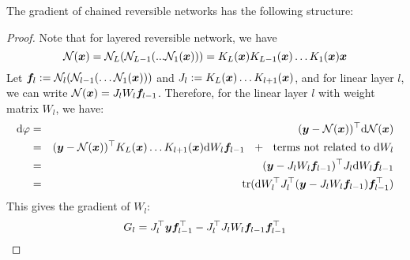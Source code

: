 The gradient of chained reversible networks has the following structure:
\gradientreversible*
\begin{proof}
Note that for layered reversible network, we have 
\begin{equation}
\mathcal{N}({\bm{x}}) = \mathcal{N}_L(\mathcal{N}_{L-1}(...\mathcal{N}_1({\bm{x}}))) = K_L({\bm{x}})K_{L-1}({\bm{x}})\ldots K_1({\bm{x}}){\bm{x}} 
\end{equation}
Let ${\bm{f}}_l := \mathcal{N}_l(\mathcal{N}_{l-1}(\ldots\mathcal{N}_1({\bm{x}})))$ and $J_l := K_L({\bm{x}})\ldots K_{l+1}({\bm{x}})$, and for linear layer $l$, we can write $\mathcal{N}({\bm{x}}) = J_lW_l {\bm{f}}_{l-1}$. Therefore, for the linear layer $l$ with weight matrix $W_l$, we have:
\begin{eqnarray}
    \mathrm{d} \varphi &=& ({\bm{y}} - \mathcal{N}({\bm{x}}))^\top \mathrm{d} \mathcal{N}({\bm{x}}) \\
    &=& ({\bm{y}} - \mathcal{N}({\bm{x}}))^\top K_L({\bm{x}})\ldots K_{l+1}({\bm{x}}) \mathrm{d} W_l {\bm{f}}_{l-1} \ \ +\ \ \mathrm{terms\ not\ related\ to\ }\mathrm{d} W_l \\
    &=& ({\bm{y}} - J_lW_l{\bm{f}}_{l-1})^\top J_l\mathrm{d} W_l {\bm{f}}_{l-1} \\
    &=& \mathrm{tr}(\mathrm{d} W_l^\top J_l^\top ({\bm{y}}-J_lW_l{\bm{f}}_{l-1}){\bm{f}}^\top_{l-1})
\end{eqnarray}
This gives the gradient of $W_l$:
\begin{equation}
    G_l = J_l^\top {\bm{y}} {\bm{f}}^\top_{l-1} - J_l^\top J_l W_l {\bm{f}}_{l-1}{\bm{f}}^\top_{l-1} 
\end{equation}
\end{proof}

